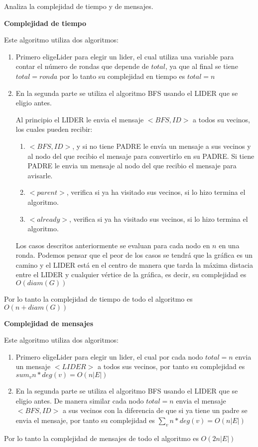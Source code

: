Analiza la complejidad de tiempo y de mensajes.

\textbf{Complejidad de tiempo}

Este algoritmo utiliza dos algoritmos:
\begin{enumerate}
    \item Primero eligeLider para elegir un lider, el cual utiliza una variable para contar el número de rondas que depende de $total$, ya que al final se tiene $total=ronda$ por lo tanto su complejidad en tiempo es $total=n$ 

    \item En la segunda parte se utiliza el algoritmo BFS usando el LIDER que se eligio antes. 

    Al principio el LIDER le envia el mensaje $<BFS,ID>$ a todos su vecinos, los cuales pueden recibir:
    \begin{enumerate}
        \item $<BFS,ID>$, y si no tiene PADRE le envía un mensaje a sus vecinos y al nodo del que recibio el mensaje para convertirlo en su PADRE. Si tiene PADRE le envia un mensaje al nodo del que recibio el mensaje para avisarle.
        \item $<parent>$, verifica si ya ha visitado sus vecinos, si lo hizo termina el algoritmo.
        \item $<already>$, verifica si ya ha visitado sus vecinos, si lo hizo termina el algoritmo.
    \end{enumerate}
    Los casos descritos anteriormente se evaluan para cada nodo en $n$ en una ronda. Podemos pensar que el peor de los casos se tendrá que la gráfica es un camino y el LIDER está en el centro de manera que tarda la máxima distacia entre el LIDER y cualquier vértice de la gráfica, es decir, su complejidad es $O(diam(G))$
\end{enumerate} 

Por lo tanto la complejidad de tiempo de todo el algoritmo es $O(n+diam(G))$


\textbf{Complejidad de mensajes}

Este algoritmo utiliza dos algoritmos:
\begin{enumerate}
    \item Primero eligeLider para elegir un lider, el cual por cada nodo $total=n$ envia un mensaje $<LIDER>$ a todos sus vecinos, por tanto su complejidad es $sum_v n * deg(v) = O(n|E|)$
    \item En la segunda parte se utiliza el algoritmo BFS usando el LIDER que se eligio antes. De manera similar cada nodo $total=n$ envia el mensaje $<BFS,ID>$ a sus vecinos con la diferencia de que si ya tiene un padre se envia el mensaje, por tanto su complejidad es $\sum_v n * deg(v) = O(n|E|)$
\end{enumerate}

Por lo tanto la complejidad de mensajes de todo el algoritmo es $O(2n|E|)$
